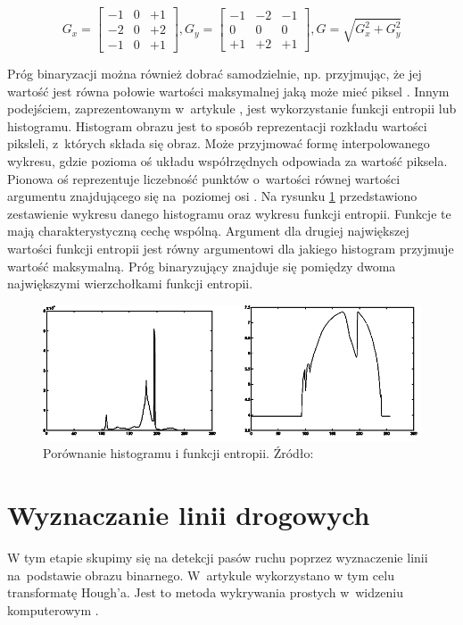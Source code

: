 \begin{equation}
G_{x} = \begin{bmatrix} -1 & 0 & +1 \\ -2 & 0 & +2 \\ -1 & 0 & +1 \end{bmatrix}, G_{y} = \begin{bmatrix} -1 & -2 & -1 \\ 0 & 0 & 0 \\ +1 & +2 & +1 \end{bmatrix},
G = \sqrt{ G_{x}^{2} + G_{y}^{2} } \label{eq:1}
\end{equation}

Próg binaryzacji można również dobrać samodzielnie, np. przyjmując, że jej wartość jest równa połowie wartości maksymalnej jaką może mieć piksel \cite{1}. Innym podejściem, zaprezentowanym w~artykule \cite{2}, jest wykorzystanie funkcji entropii lub histogramu.
Histogram obrazu jest to sposób reprezentacji rozkładu wartości piksleli, z~których składa się obraz. 
Może przyjmować formę interpolowanego wykresu, gdzie pozioma oś układu współrzędnych odpowiada za wartość piksela. 
Pionowa oś reprezentuje liczebność punktów o~wartości równej wartości argumentu znajdującego się na~poziomej osi \cite{histogram}.
Na rysunku \ref{fig:entr_hist} przedstawiono zestawienie wykresu danego histogramu oraz wykresu funkcji entropii. 
Funkcje te mają charakterystyczną cechę wspólną. 
Argument dla drugiej największej wartości funkcji entropii jest równy argumentowi dla jakiego histogram przyjmuje wartość maksymalną. Próg binaryzujący znajduje się pomiędzy dwoma największymi wierzchołkami funkcji entropii.

\begin{figure}
	\includegraphics[scale=0.8]{Entropia.png}
	\caption{Porównanie histogramu i funkcji entropii. Źródło: \cite{2}}
	\label{fig:entr_hist}
\end{figure}


\section{Wyznaczanie linii drogowych}
W tym etapie skupimy się na detekcji pasów ruchu poprzez wyznaczenie linii na~podstawie obrazu binarnego. 
W~artykule \cite{reichenbach2018comparison} wykorzystano w tym celu transformatę Hough'a. 
Jest to metoda wykrywania prostych w~widzeniu komputerowym \cite{hough}.

